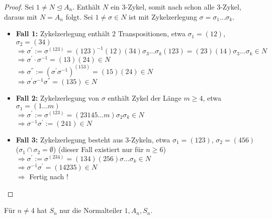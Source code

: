 \begin{proof}
	Sei $1 \neq N \unlhd A_n$. Enthält $N$ ein $3$-Zykel, somit nach  schon alle $3$-Zykel, daraus mit  $N = A_n$ folgt. Sei $1 \neq \sigma \in N$ ist mit Zykelzerlegung $\sigma = \sigma_1\dots \sigma_k$.
	\begin{itemize}
		\item \textbf{Fall 1:} Zykelzerlegung enthält 2 Transpositionen, etwa $\sigma_1 = (12)$, $\sigma_2 = (34)$\\
		$\Rightarrow \sigma^{'} := \sigma^{(123)} = (123)^{-1}(12)(34)\sigma_3\dots\sigma_k(123) = (23)(14)\sigma_3\dots\sigma_k \in N$\\
		$\Rightarrow \sigma^{'}\cdot\sigma^{-1} = (13)(24) \in N$\\
		$\Rightarrow \sigma^{''} := (\sigma^{'}\sigma^{-1})^{(153)} = (15)(24) \in N$\\
		$\Rightarrow \sigma^{'}\sigma^{-1}\sigma^{''} = (135) \in N$
		\item \textbf{Fall 2:} Zykelzerlegung von $\sigma$ enthält Zykel der Länge $m \geq 4$, etwa $\sigma_1 = (1\dots m)$\\
		$\Rightarrow \sigma^{'}:=\sigma^{(123)} = (23145\dots m)\sigma_2\sigma_k \in N$\\
		$\Rightarrow \sigma^{-1}\sigma^{'} :=(241)\in N$
		\item \textbf{Fall 3:} Zykelzerlegung besteht aus $3$-Zykeln, etwa $\sigma_1 = (123)$, $\sigma_2=(456)$ ($\sigma_1 \cap \sigma_2 = \emptyset$) (dieser Fall existiert nur für $n \geq 6$)\\
		$\Rightarrow \sigma^{'} := \sigma^{(234)} = (134)(256)\sigma\dots\sigma_k \in N$\\
		$\Rightarrow \sigma^{-1}\sigma^{'} = (14235) \in N$\\
		$\Rightarrow$ Fertig nach !
	\end{itemize} 
\end{proof}

\begin{conclusion}
	Für $n\neq 4$ hat $S_n$ nur die Normalteiler $1,A_n,S_n$.
\end{conclusion}

